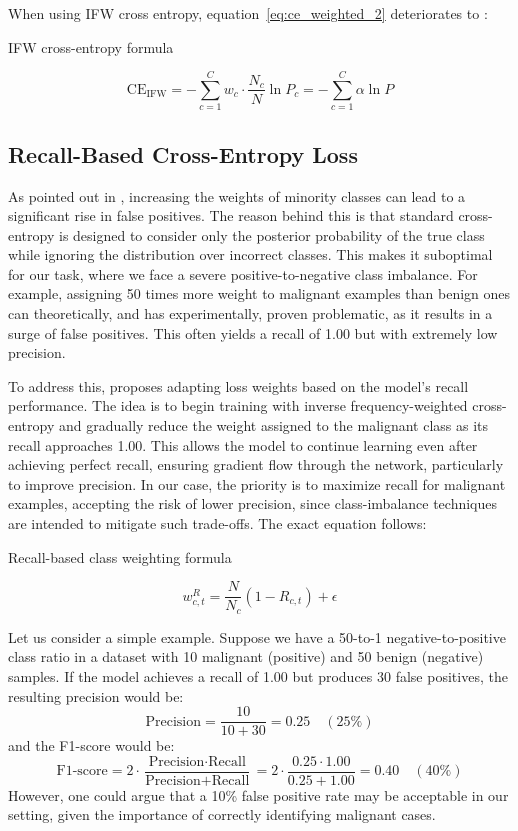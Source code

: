 When using IFW cross entropy, equation~\eqref{eq:ce_weighted_2} deteriorates to : 
\begin{myequation}
\caption{IFW cross-entropy formula}
\label{eq:ce_ifw}
\[
\text{CE}_{\text{IFW}} = -\sum_{c=1}^{C} w_c \cdot \frac{N_c}{N} \ln P_c 
= -\sum_{c=1}^{C} \alpha \ln P
\]
\end{myequation}


\subsection{Recall-Based Cross-Entropy Loss}

As pointed out in \cite{dynamic_loss_balancing}, increasing the weights of minority classes can lead to a significant rise in false positives. The reason behind this is that standard cross-entropy is designed to consider only the posterior probability of the true class while ignoring the distribution over incorrect classes. This makes it suboptimal for our task, where we face a severe positive-to-negative class imbalance. For example, assigning 50 times more weight to malignant examples than benign ones can theoretically, and has experimentally, proven problematic, as it results in a surge of false positives. This often yields a recall of 1.00 but with extremely low precision.

To address this, \cite{dynamic_loss_balancing} proposes adapting loss weights based on the model’s recall performance. The idea is to begin training with inverse frequency-weighted cross-entropy and gradually reduce the weight assigned to the malignant class as its recall approaches 1.00. This allows the model to continue learning even after achieving perfect recall, ensuring gradient flow through the network, particularly to improve precision. In our case, the priority is to maximize recall for malignant examples, accepting the risk of lower precision, since class-imbalance techniques are intended to mitigate such trade-offs.
The exact equation follows:

\begin{myequation}
\caption{Recall-based class weighting formula}
\label{eq:recall_weight}
\[
w^{R}_{c,t} = \frac{N}{N_c} \left( 1 - R_{c,t} \right) + \epsilon
\]
\end{myequation}


Let us consider a simple example. Suppose we have a 50-to-1 negative-to-positive class ratio in a dataset with 10 malignant (positive) and 50 benign (negative) samples. If the model achieves a recall of 1.00 but produces 30 false positives, the resulting precision would be:
\[
\text{Precision} = \frac{10}{10 + 30} = 0.25 \quad (25\%)
\]
and the F1-score would be:
\[
\text{F1-score} = 2 \cdot \frac{\text{Precision} \cdot \text{Recall}}{\text{Precision} + \text{Recall}} = 2 \cdot \frac{0.25 \cdot 1.00}{0.25 + 1.00} = 0.40 \quad (40\%)
\]
However, one could argue that a 10\% false positive rate may be acceptable in our setting, given the importance of correctly identifying malignant cases.


